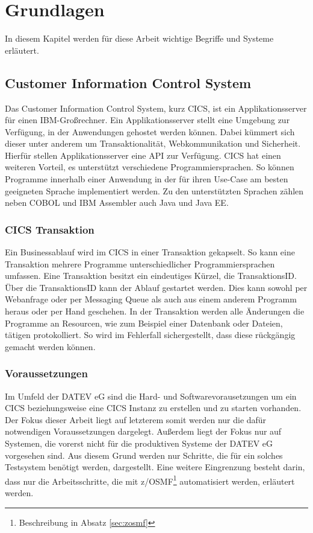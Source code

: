 \chapter{Grundlagen}\label{ch:grundlagen}
In diesem Kapitel werden für diese Arbeit wichtige Begriffe und Systeme erläutert.

\section{Customer Information Control System}\label{cics}
Das Customer Information Control System, kurz CICS, ist ein Applikationsserver für einen IBM-Großrechner.
Ein Applikationsserver stellt eine Umgebung zur Verfügung, in der Anwendungen gehostet werden können.
Dabei kümmert sich dieser unter anderem um Transaktionalität, Webkommunikation und Sicherheit.
Hierfür stellen Applikationsserver eine API zur Verfügung.
CICS hat einen weiteren Vorteil, es unterstützt verschiedene Programmiersprachen.
So können Programme innerhalb einer Anwendung in der für ihren Use-Case am besten geeigneten Sprache implementiert werden.
Zu den unterstützten Sprachen zählen neben COBOL und IBM Assembler auch Java und Java EE.
\cite{Rayns.2011}

\subsection{CICS Transaktion}\label{subsec:trans}
Ein Businessablauf wird im CICS in einer Transaktion gekapselt.
So kann eine Transaktion mehrere Programme unterschiedlicher Programmiersprachen umfassen.
Eine Transaktion besitzt ein eindeutiges Kürzel, die TransaktionsID.
Über die TransaktionsID kann der Ablauf gestartet werden.
Dies kann sowohl per Webanfrage oder per Messaging Queue als auch aus einem anderem Programm heraus oder per Hand geschehen.
In der Transaktion werden alle Änderungen die Programme an Resourcen, wie zum Beispiel einer Datenbank oder Dateien, tätigen protokolliert.
So wird im Fehlerfall sichergestellt, dass diese rückgängig gemacht werden können.
 \cite{Rayns.2011}

\subsection{Voraussetzungen}\label{subsec:voraus}
Im Umfeld der DATEV eG sind die Hard- und Softwarevorausetzungen um ein CICS beziehungsweise eine CICS Instanz zu erstellen und zu starten vorhanden.
Der Fokus dieser Arbeit liegt auf letzterem somit werden nur die dafür notwendigen Voraussetzungen dargelegt.
Außerdem liegt der Fokus nur auf Systemen, die vorerst nicht für die produktiven Systeme der DATEV eG vorgesehen sind.
Aus diesem Grund werden nur Schritte, die für ein solches Testsystem benötigt werden, dargestellt.
Eine weitere Eingrenzung besteht darin, dass nur die Arbeitsschritte, die mit z/OSMF\footnote{Beschreibung in Absatz \ref{sec:zosmf}} automatisiert werden, erläutert werden.

